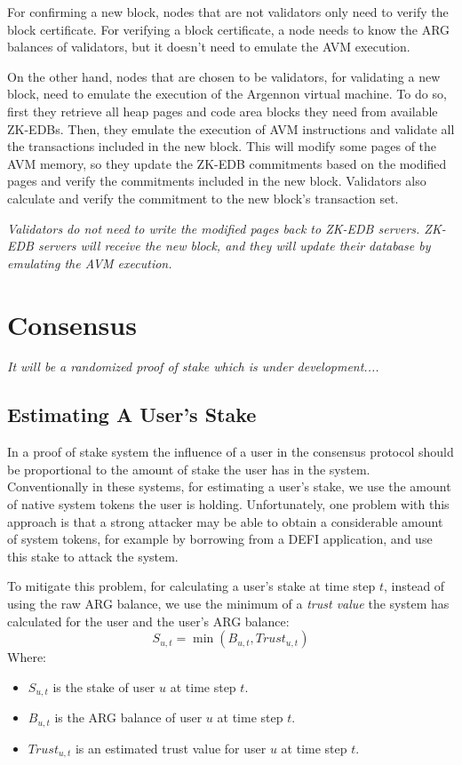 \documentclass[11pt, a4paper]{report}
\newcommand{\note}[1] {
    \begin{tcolorbox}[colframe=white,colback=white]
        \emph{#1}
    \end{tcolorbox}
}
\begin{document}
    For confirming a new block, nodes that are not validators only need to verify the block certificate. For
    verifying a block certificate, a node needs to know the ARG balances of validators, but it doesn't need to
    emulate the AVM execution.

    On the other hand, nodes that are chosen to be validators, for validating a new block, need to emulate the
    execution of the Argennon virtual machine. To do so, first they retrieve all heap pages and code area blocks they
    need from available ZK-EDBs. Then, they emulate the execution of AVM instructions and validate all the
    transactions included in the new block. This will modify some pages of the AVM memory, so they update the ZK-EDB
    commitments based on the modified pages and verify the commitments included in the new block. Validators also
    calculate and verify the commitment to the new block's transaction set.

    \note{Validators do not need to write the modified pages back to ZK-EDB servers. ZK-EDB servers will receive the new
    block, and they will update their database by emulating the AVM execution.}


    \section{Consensus}\label{sec:consensus}

    \note{It will be a randomized proof of stake which is under development....}

    \subsection{Estimating A User's Stake}\label{subsec:estimating-a-user's-stake}

    In a proof of stake system the influence of a user in the consensus protocol should be proportional to the amount
    of stake the user has in the system. Conventionally in these systems, for estimating a user's stake, we use the
    amount of native system tokens the user is holding. Unfortunately, one problem with this approach is that a
    strong attacker may be able to obtain a considerable amount of system tokens, for example by borrowing from a
    DEFI application, and use this stake to attack the system.

    To mitigate this problem, for calculating a user's stake at time step \(t\), instead of using the raw ARG
    balance, we use the minimum of a \emph{trust value} the system has calculated for the user and the user's
    ARG balance:
    \[
        S_{u,t} = \min (B_{u,t}, Trust_{u,t})
    \]
    Where:
    \begin{itemize}
        \item \(S_{u,t}\) is the stake of user \(u\) at time step \(t\).
        \item \(B_{u,t}\) is the ARG balance of user \(u\) at time step \(t\).
        \item \(Trust_{u,t}\) is an estimated trust value for user \(u\) at time step \(t\).
    \end{itemize}
\end{document}

